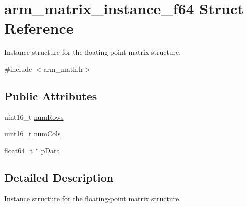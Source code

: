 \hypertarget{structarm__matrix__instance__f64}{\section{arm\-\_\-matrix\-\_\-instance\-\_\-f64 Struct Reference}
\label{structarm__matrix__instance__f64}
}


Instance structure for the floating-\/point matrix structure.  




{\ttfamily \#include $<$arm\-\_\-math.\-h$>$}

\subsection*{Public Attributes}
\begin{DoxyCompactItemize}
\item 
uint16\-\_\-t \hyperlink{structarm__matrix__instance__f64_a8b44d1e5003345047c4ead9e1593bf22}{num\-Rows}
\item 
uint16\-\_\-t \hyperlink{structarm__matrix__instance__f64_ab0f0399aff3201880e2d8a447de9a7ee}{num\-Cols}
\item 
float64\-\_\-t $\ast$ \hyperlink{structarm__matrix__instance__f64_a5b2475f8ff1e4818955cdd18bc40a097}{p\-Data}
\end{DoxyCompactItemize}


\subsection{Detailed Description}
Instance structure for the floating-\/point matrix structure. 

